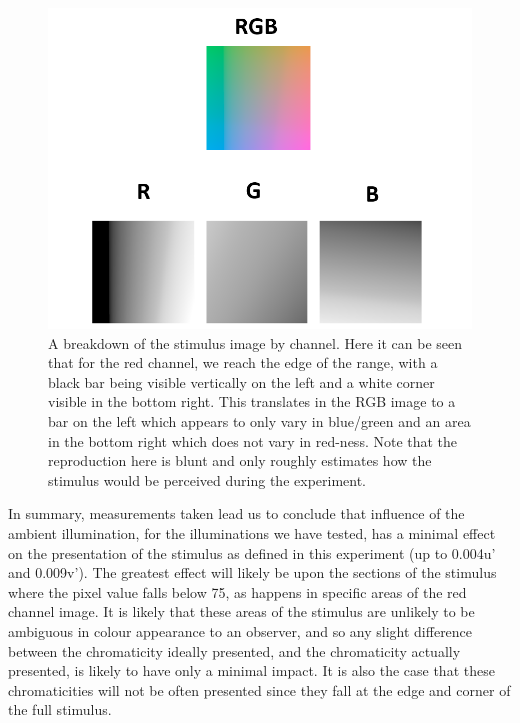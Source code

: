 \begin{figure}[hbtp]
\includegraphics[max width=\textwidth]{figs/tablet/stimchan.png}
\caption{A breakdown of the stimulus image by channel. Here it can be seen that for the red channel, we reach the edge of the range, with a black bar being visible vertically on the left and a white corner visible in the bottom right. This translates in the RGB image to a bar on the left which appears to only vary in blue/green and an area in the bottom right which does not vary in red-ness. Note that the reproduction here is blunt and only roughly estimates how the stimulus would be perceived during the experiment.}
\label{fig:stimchan}
\end{figure}

In summary, measurements taken lead us to conclude that influence of the ambient illumination, for the illuminations we have tested, has a minimal effect on the presentation of the stimulus as defined in this experiment (up to 0.004u' and 0.009v'). The greatest effect will likely be upon the sections of the stimulus where the pixel value falls below 75, as happens in specific areas of the red channel image. It is likely that these areas of the stimulus are unlikely to be ambiguous in colour appearance to an observer, and so any slight difference between the chromaticity ideally presented, and the chromaticity actually presented, is likely to have only a minimal impact. It is also the case that these chromaticities will not be often presented since they fall at the edge and corner of the full stimulus. %


